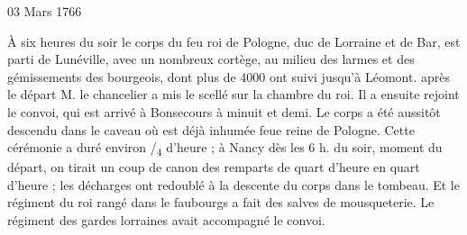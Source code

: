                      \begin{diary}{03 Mars 1766}{}

                         À six heures du soir le corps du
                           feu roi de Pologne, duc de
                           Lorraine et
                           de Bar, est parti de Lunéville, avec
                           un nombreux cortège, au milieu des larmes et des gémissements des bourgeois, dont plus
                           de 4000 ont suivi jusqu'à Léomont.
                           après le départ M. le
                              chancelier a mis
                           le scellé sur la chambre du roi. Il a ensuite
                           rejoint le convoi, qui est arrivé à Bonsecours
                           à minuit et demi. Le corps a été aussitôt
                           descendu dans le caveau où est déjà inhumée
                           feue reine de Pologne.
                           Cette cérémonie
                           a duré environ /\textsubscript{4}
                           d'heure ; à Nancy dès
                           les 6 h. du soir, moment du départ, on tirait
                           un coup de canon des remparts de quart
                           d'heure en quart d'heure ; les décharges ont
                           redoublé à la descente du corps dans le tombeau.
                           Et le régiment du roi rangé dans le faubourgs
                           a fait des salves de mousqueterie. Le
                              régiment des gardes lorraines avait accompagné
                           le convoi. \bigskip


                     \end{diary}

